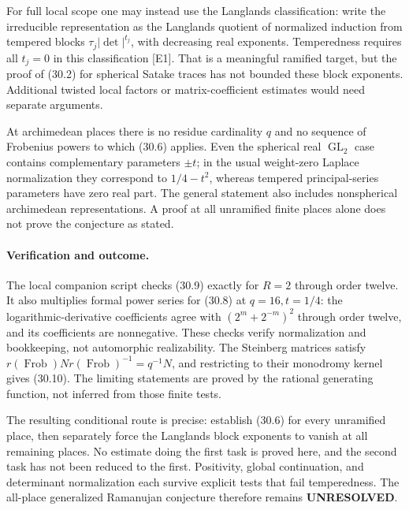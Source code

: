 \documentclass[11pt]{article}
\begin{document}
For full local scope one may instead use the Langlands classification:
write the irreducible representation as the Langlands quotient of normalized
induction from tempered blocks $\tau_j|\det|^{t_j}$, with decreasing real
exponents. Temperedness requires all $t_j=0$ in this classification [E1].
That is a meaningful ramified target, but the proof of (30.2) for spherical
Satake traces has not bounded these block exponents. Additional twisted
local factors or matrix-coefficient estimates would need separate arguments.

At archimedean places there is no residue cardinality $q$ and no sequence
of Frobenius powers to which (30.6) applies. Even the spherical real
$\operatorname{GL}_2$ case contains complementary parameters $\pm t$;
in the usual weight-zero Laplace normalization they correspond to
$1/4-t^2$, whereas tempered principal-series parameters have zero real
part. The general statement also includes nonspherical archimedean
representations. A proof at all unramified finite places alone does not
prove the conjecture as stated.

\paragraph{Verification and outcome.}
The local companion script checks (30.9) exactly for $R=2$ through order
twelve. It also multiplies formal power series for (30.8) at $q=16,t=1/4$:
the logarithmic-derivative coefficients agree with
$(2^m+2^{-m})^2$ through order twelve, and its coefficients are nonnegative.
These checks verify normalization and bookkeeping, not automorphic
realizability. The Steinberg matrices satisfy
$r(\operatorname{Frob})Nr(\operatorname{Frob})^{-1}=q^{-1}N$, and restricting
to their monodromy kernel gives (30.10). The limiting statements are proved
by the rational generating function, not inferred from those finite tests.

The resulting conditional route is precise: establish (30.6) for every
unramified place, then separately force the Langlands block exponents to
vanish at all remaining places. No estimate doing the first task is proved
here, and the second task has not been reduced to the first. Positivity,
global continuation, and determinant normalization each survive explicit
tests that fail temperedness. The all-place generalized Ramanujan conjecture
therefore remains \textbf{UNRESOLVED}.
\end{document}
